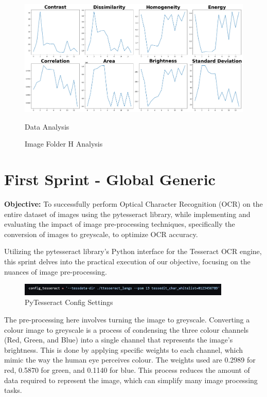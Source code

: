 \begin{figure}[ht]
\begin{minipage}[t]{0.50\textwidth}
        \includegraphics[width=\textwidth]{Figures/EDA_Charts/11/da.png}
        \caption*{Data Analysis}
    \end{minipage}
    \caption{Image Folder H Analysis}
    \label{fig:Image Folder H Analysis}
\end{figure}


\newpage

\section{First Sprint - Global Generic}


\textbf{Objective:} To successfully perform Optical Character Recognition (OCR) on the entire dataset of images using the pytesseract library, while implementing and evaluating the impact of image pre-processing techniques, specifically the conversion of images to greyscale, to optimize OCR accuracy.

Utilizing the pytesseract library's Python interface for the Tesseract OCR engine, this sprint delves into the practical execution of our objective, focusing on the nuances of image pre-processing.

\begin{figure}[ht]
    \centering
    \includegraphics[width=0.9\textwidth]{Figures/firstrun/tesseract_config.jpg}
    \caption[PyTesseract Config Settings]{PyTesseract Config Settings}
    \label{fig:PyTesseract Config Settings}
\end{figure}


The pre-processing here involves turning the image to greyscale. Converting a colour image to greyscale is a process of condensing the three colour channels (Red, Green, and Blue) into a single channel that represents the image's brightness. This is done by applying specific weights to each channel, which mimic the way the human eye perceives colour. The weights used are 0.2989 for red, 0.5870 for green, and 0.1140 for blue. This process reduces the amount of data required to represent the image, which can simplify many image processing tasks. \cite{cadikPerceptualEvaluationColortoGrayscale2008}

